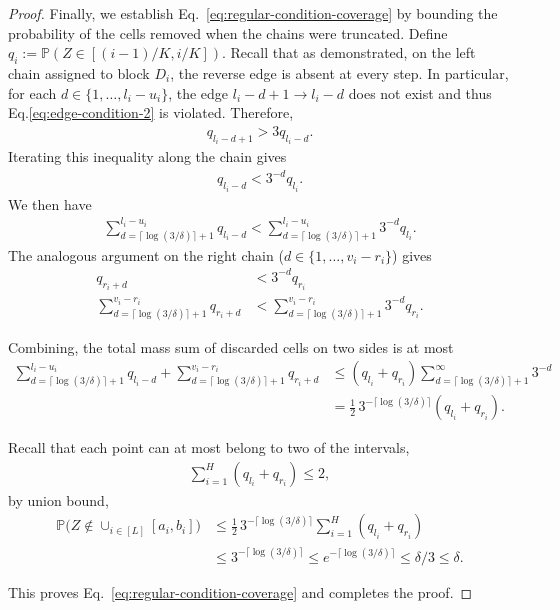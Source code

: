 \documentclass[11pt]{article}
\theoremstyle{statplain}
\theoremstyle{statdefinition}
\newcommand{\ra}{\rightarrow}
\newcommand{\PP}{\mathbb{P}}
\newcommand{\0}{\mathbf{0}}
\newcommand{\discreteNum}{K} %
\begin{document}
\begin{proof}
Finally, we establish Eq.~\eqref{eq:regular-condition-coverage} by bounding the probability of the cells removed when the
chains were truncated. 
Define $q_i:=\PP( Z \in [(i-1)/\discreteNum, i/\discreteNum])$. Recall that as demonstrated, on the left chain assigned to block $D_i$,
the reverse edge is absent at every step. In particular, for each
$d\in\{1,\dots, l_i-u_i\}$, the edge
$ l_i-d+1\ra l_i-d$ does not exist and thus Eq.\eqref{eq:edge-condition-2} is violated. Therefore, 
\begin{align*}
 q_{ l_i-d+1}>3q_{ l_i-d}.
\end{align*}
Iterating this inequality along the chain gives
\begin{align*}
 q_{ l_i-d}<3^{-d}q_{ l_i}.
\end{align*}
We then have 
\begin{align*}    \sum_{d=\lceil\log(3/\delta)\rceil+1}^{ l_i-u_i}q_{ l_i-d} < \sum_{d=\lceil\log(3/\delta)\rceil+1}^{ l_i-u_i}3^{-d} q_{ l_i} .
\end{align*}
The analogous argument on the right chain ($d\in\{1,\dots,v_i-r_i\}$) gives
\begin{align*}
 q_{r_i+d}&<3^{-d}q_{r_i}
\\ \sum_{d=\lceil\log(3/\delta)\rceil+1}^{v_i-r_i}q_{r_i+d} &< \sum_{d=\lceil\log(3/\delta)\rceil+1}^{v_i-r_i}3^{-d}q_{r_i}.
\end{align*}

Combining, the total mass sum of discarded cells on two sides
is at most
\begin{align*}
 \sum_{d=\lceil\log(3/\delta)\rceil+1}^{ l_i-u_i}q_{ l_i-d}
 +\sum_{d=\lceil\log(3/\delta)\rceil+1}^{v_i-r_i}q_{r_i+d} &\leq (q_{ l_i}+q_{r_i})\sum_{d=\lceil\log(3/\delta)\rceil+1}^{\infty}3^{-d}\\
 &=\frac12\,3^{-\lceil\log(3/\delta)\rceil}(q_{ l_i}+q_{r_i}) \tag{sum of geometric series}.
\end{align*}

 Recall that each point can at most belong to two of the intervals,
\begin{align*}
 \sum_{i=1}^H(q_{ l_i}+q_{r_i})\leq2,
\end{align*}
by union bound,
\begin{align*}
 \PP\Big(Z\notin\cup_{i\in[L]}[a_i,b_i]\Big)
 &\leq\frac12\,3^{-\lceil\log(3/\delta)\rceil}\sum_{i=1}^H(q_{ l_i}+q_{r_i})\\
 &\leq3^{-\lceil\log(3/\delta)\rceil}\leq e^{-\lceil\log(3/\delta)\rceil}\leq\delta/3\leq\delta.
\end{align*}

This proves Eq.~\eqref{eq:regular-condition-coverage} and completes
the proof.

\end{proof}
\end{document}
